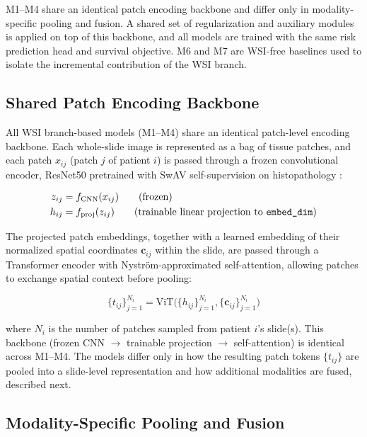 M1--M4 share an identical patch encoding backbone and
differ only in modality-specific pooling and fusion.
A shared set of regularization and auxiliary modules is applied on top of this
backbone, and all models are trained with the same
risk prediction head and survival objective. M6 and M7
are WSI-free baselines used to isolate the incremental contribution of the WSI branch.

\subsection{Shared Patch Encoding Backbone}
\label{subsec:backbone}

All WSI branch-based models (M1--M4) share an identical patch-level encoding
backbone. Each whole-slide image is represented as a bag of tissue patches, and each
patch $x_{ij}$ (patch $j$ of patient $i$) is passed through a frozen convolutional
encoder, ResNet50 pretrained with SwAV self-supervision on histopathology
\cite{lunit-swav}:

\begin{align}
  z_{ij} &= f_{\mathrm{CNN}}(x_{ij}) \qquad \text{(frozen)} \\
  h_{ij} &= f_{\mathrm{proj}}(z_{ij}) \qquad \text{(trainable linear projection to \texttt{embed\_dim})}
\end{align}

The projected patch embeddings, together with a learned embedding of their
normalized spatial coordinates $\mathbf{c}_{ij}$ within the slide, are passed
through a Transformer encoder with Nystr\"om-approximated self-attention, allowing
patches to exchange spatial context before pooling:

\begin{equation}
  \{t_{ij}\}_{j=1}^{N_i} = \mathrm{ViT}\big(\{h_{ij}\}_{j=1}^{N_i}, \{\mathbf{c}_{ij}\}_{j=1}^{N_i}\big)
\end{equation}

where $N_i$ is the number of patches sampled from patient $i$'s slide(s). This
backbone (frozen CNN $\rightarrow$ trainable projection $\rightarrow$
self-attention) is identical across M1--M4. The models differ only in how the
resulting patch tokens $\{t_{ij}\}$ are pooled into a slide-level representation and
how additional modalities are fused, described next.

\subsection{Modality-Specific Pooling and Fusion}
\label{subsec:pooling-fusion}

